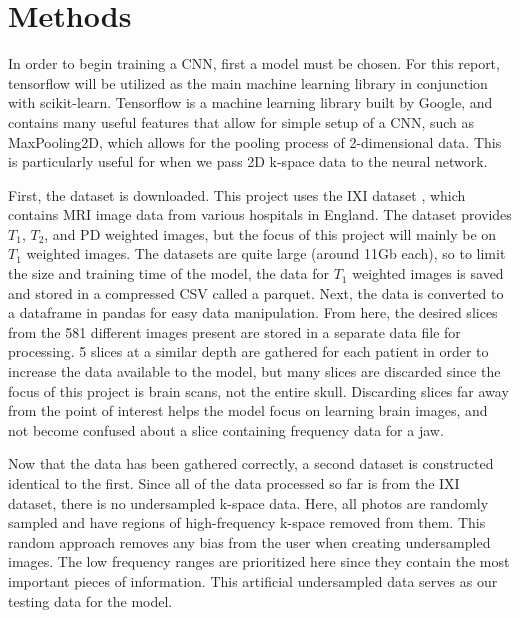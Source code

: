 \documentclass[14pt]{extreport}
\begin{document}
    \section*{Methods}
        In order to begin training a CNN, first a model must be chosen. For this report, tensorflow will be utilized as the main machine learning library in conjunction with scikit-learn. Tensorflow is a machine learning library built by Google, and contains many useful features that allow for simple setup of a CNN, such as MaxPooling2D, which allows for the pooling process of 2-dimensional data. This is particularly useful for when we pass 2D k-space data to the neural network. 

        First, the dataset is downloaded. This project uses the IXI dataset \cite{IXI_Dataset}, which contains MRI image data from various hospitals in England. The dataset provides $T_1$, $T_2$, and PD weighted images, but the focus of this project will mainly be on $T_1$ weighted images. The datasets are quite large (around 11Gb each), so to limit the size and training time of the model, the data for $T_1$ weighted images is saved and stored in a compressed CSV called a parquet. Next, the data is converted to a dataframe in pandas for easy data manipulation. From here, the desired slices from the 581 different images present are stored in a separate data file for processing. 5 slices at a similar depth are gathered for each patient in order to increase the data available to the model, but many slices are discarded since the focus of this project is brain scans, not the entire skull. Discarding slices far away from the point of interest helps the model focus on learning brain images, and not become confused about a slice containing frequency data for a jaw. 

        Now that the data has been gathered correctly, a second dataset is constructed identical to the first. Since all of the data processed so far is from the IXI dataset, there is no undersampled k-space data. Here, all photos are randomly sampled and have regions of high-frequency k-space removed from them. This random approach removes any bias from the user when creating undersampled images. The low frequency ranges are prioritized here since they contain the most important pieces of information. This artificial undersampled data serves as our testing data for the model. 
\end{document}
